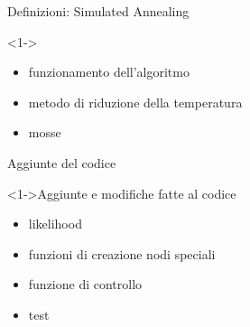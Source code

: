 \documentclass{beamer}
\begin{document}
\begin{tframe}{Definizioni: Simulated Annealing}
  \begin{block}<1->{\ }
    \begin{itemize}
      \item funzionamento dell'algoritmo
      \item metodo di riduzione della temperatura
      \item mosse
    \end{itemize}
  \end{block}
\end{tframe}

\begin{tframe}{Aggiunte del codice}
  \begin{block}<1->{Aggiunte e modifiche fatte al codice}
    \begin{itemize}
      \item likelihood
      \item funzioni di creazione nodi speciali
      \item funzione di controllo
      \item test
    \end{itemize}
  \end{block}
\end{tframe}
\end{document}

